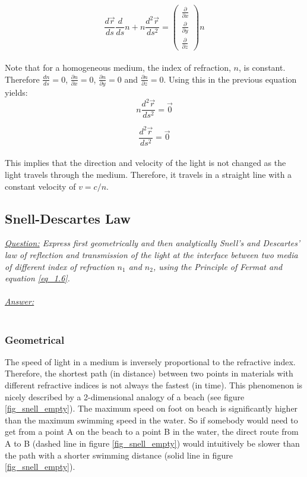 \documentclass{article}
\def\Nabla{
	\begin{pmatrix}
		\frac{\partial}{\partial {x}} \\
		\frac{\partial}{\partial {y}} \\
		\frac{\partial}{\partial {z}}
	\end{pmatrix}}
\begin{document}
\begin{equation}
	\frac{d \vec{r}}{ds} \frac{d}{ds} n + n \frac{d^2 \vec{r}}{ds^2} = \Nabla n
\end{equation} \\

Note that for a homogeneous medium, the index of refraction, $n$, is constant. Therefore $\frac{dn}{ds} = 0$, $\frac{\partial n}{\partial x} = 0$, $\frac{\partial n}{\partial y} = 0$ and $\frac{\partial n}{\partial z} = 0$. Using this in the previous equation yields: \\

\begin{equation}
	 n \frac{d^2 \vec{r}}{ds^2} = \vec{0}
\end{equation}

\begin{equation}
	 \frac{d^2 \vec{r}}{ds^2} = \vec{0}
\end{equation} \\


This implies that the direction and velocity of the light is not changed as the light travels through the medium. Therefore, it travels in a straight line with a constant velocity of $ v = c/n $. \\

\subsection{Snell-Descartes Law}

\textit{\underline{Question:} Express first geometrically and then analytically Snell's and Descartes' law of reflection and transmission of the light at the interface between two media of different index of refraction $n_1$ and $n_2$, using the Principle of Fermat and equation \ref{eq_1.6}.}\\
\\
\textit{\underline{Answer:}} \\
\\

\subsubsection{Geometrical}
The speed of light in a medium is inversely proportional to the refractive index. Therefore, the shortest path (in distance) between two points in materials with different refractive indices is not always the fastest (in time). This phenomenon is nicely described by a 2-dimensional analogy of a beach (see figure \ref{fig_snell_empty}). The maximum speed on foot on beach is significantly higher than the maximum swimming speed in the water. So if somebody would need to get from a point A on the beach to a point B in the water, the direct route from A to B (dashed line in figure \ref{fig_snell_empty}) would intuitively be slower than the path with a shorter swimming distance (solid line in figure \ref{fig_snell_empty}).
\end{document}

